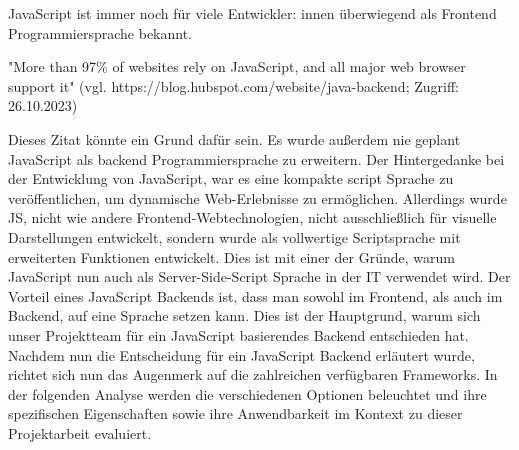 JavaScript ist immer noch für viele Entwickler: innen überwiegend als Frontend Programmiersprache bekannt. 

"More than 97\% of websites rely on JavaScript, and all major web browser support it"
(vgl. https://blog.hubspot.com/website/java-backend; Zugriff: 26.10.2023)

Dieses Zitat könnte ein Grund dafür sein. Es wurde außerdem nie geplant JavaScript als backend Programmiersprache zu erweitern. Der Hintergedanke bei der Entwicklung von JavaScript, war es eine kompakte script Sprache zu veröffentlichen, um dynamische Web-Erlebnisse zu ermöglichen. Allerdings wurde JS, nicht wie andere Frontend-Webtechnologien, nicht ausschließlich für visuelle Darstellungen entwickelt, sondern wurde als vollwertige Scriptsprache mit erweiterten Funktionen entwickelt. Dies ist mit einer der Gründe, warum JavaScript nun auch als Server-Side-Script Sprache in der IT verwendet wird.
\newline
Der Vorteil eines JavaScript Backends ist, dass man sowohl im Frontend, als auch im Backend, auf eine Sprache setzen kann. Dies ist der Hauptgrund, warum sich unser Projektteam für ein JavaScript basierendes Backend entschieden hat.
\newline
Nachdem nun die Entscheidung für ein JavaScript Backend erläutert wurde, richtet sich nun das Augenmerk auf die zahlreichen verfügbaren Frameworks. In der folgenden Analyse werden die verschiedenen Optionen beleuchtet und ihre spezifischen Eigenschaften sowie ihre Anwendbarkeit im Kontext zu dieser Projektarbeit evaluiert.
\cite{Backend_JavaScript}